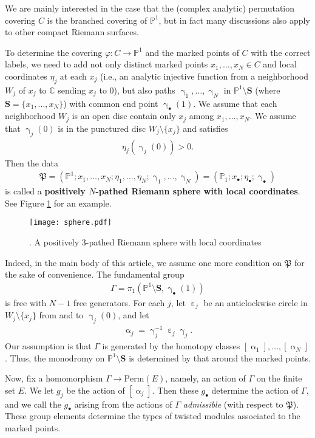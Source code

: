 \documentclass[12pt,a4paper,notitlepage]{article}
\theoremstyle{definition}
\theoremstyle{plain}
\newcommand{\fk}{\mathfrak}
\newcommand{\blt}{\bullet}
\newcommand{\Cbb}{\mathbb C}
\newcommand{\Pbb}{\mathbb P}
\newcommand{\Sbf}{\mathbf{S}}
\newcommand{\Perm}{\mathrm{Perm}}
\numberwithin{equation}{subsection}
\begin{document}
We are mainly interested in the case that the (complex analytic) permutation covering $C$ is the branched covering of $\Pbb^1$, but in fact many discussions also apply to other compact Riemann surfaces. 

To determine the covering $\varphi:C\rightarrow\Pbb^1$ and the marked points of $C$ with the correct labels, we need to add not only distinct marked points $x_1,\dots,x_N\in C$ and local coordinates $\eta_j$ at each $x_j$ (i.e., an analytic injective function from a neighborhood $W_j$ of $x_j$ to $\Cbb$ sending $x_j$ to $0$), but also paths $\upgamma_1,\dots,\upgamma_N$ in $\Pbb^1\setminus\Sbf$ (where $\Sbf=\{x_1,\dots,x_N\}$) with common end point $\upgamma_\blt(1)$. We assume that  each neighborhood $W_j$ is an open disc contain only $x_j$ among $x_1,\dots,x_N$. We assume that $\upgamma_j(0)$ is in the punctured disc $W_j\setminus\{x_j\}$ and satisfies
\begin{align}
\eta_j(\upgamma_j(0))>0.\label{eq101}	
\end{align}
Then the data
\begin{align}
\fk P=(\Pbb^1;x_1,\dots,x_N;\eta_1,\dots,\eta_N;\upgamma_1,\dots,\upgamma_N)=(\Pbb_1;x_\blt;\eta_\blt;\upgamma_\blt)\label{eq102}
\end{align}
is called a \textbf{positively $N$-pathed Riemann sphere with local coordinates}. See Figure \ref{fig1} for an example.
\begin{figure}[h]
	\centering
	\texttt{[image: sphere.pdf]}
	\caption{. A positively $3$-pathed Riemann sphere with local coordinates}
	\label{fig1}
\end{figure}

Indeed, in the main body of this article, we assume one more condition on  $\fk P$ for the sake of convenience. The fundamental group
\begin{align*}
\Gamma=\pi_1(\Pbb^1\setminus\Sbf,\upgamma_\blt(1))	
\end{align*}
is free with $N-1$ free generators. For each $j$, let $\upepsilon_j$ be an anticlockwise circle in $W_j\setminus\{x_j\}$ from and to $\upgamma_j(0)$, and let
\begin{align*}
\upalpha_j=\upgamma_j^{-1}\upepsilon_j\upgamma_j.	
\end{align*}
Our assumption is that $\Gamma$ is generated by the homotopy classes $[\upalpha_1],\dots,[\upalpha_N]$. Thus, the monodromy on $\Pbb^1\setminus\Sbf$ is determined by that around the marked points.


Now, fix a homomorphism $\Gamma\rightarrow\Perm(E)$, namely, an action of $\Gamma$ on the finite set $E$. We let $g_j$ be the action of $[\upalpha_j]$. Then these $g_\blt$ determine the action of $\Gamma$, and we call the $g_\blt$ arising from the actions of $\Gamma$ \textit{admissible}  (with respect to $\fk P$). These group elements determine the types of twisted modules associated to the marked points.
\end{document}
